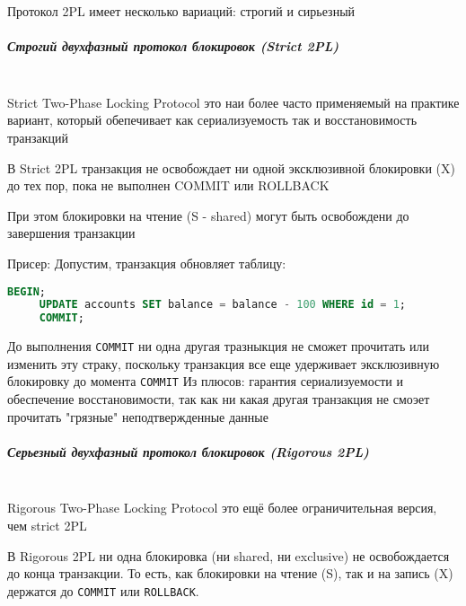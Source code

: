  Протокол 2PL имеет несколько вариаций: строгий и сирьезный
 
 \subparagraph{Строгий двухфазный протокол блокировок (Strict 2PL)} ~\\
 
 Strict Two-Phase Locking Protocol это наи более часто применяемый на практике вариант, который обепечивает как сериализуемость так и восстановимость транзакций
 
 \begin{grayquote}
     В Strict 2PL транзакция не освобождает ни одной эксклюзивной блокировки (X) до тех пор, пока не выполнен COMMIT или ROLLBACK \autocite{Silberschatz}
 \end{grayquote}
 
 При этом блокировки на чтение (S - shared) могут быть освобождени до завершения транзакции
 
 Присер:
 Допустим, транзакция обновляет таблицу:
 
 \begin{lstlisting}[language=SQL]
     BEGIN;
     UPDATE accounts SET balance = balance - 100 WHERE id = 1;
     COMMIT;    
 \end{lstlisting}
 До выполнения \texttt{COMMIT} ни одна другая тразныкция не сможет прочитать или изменить эту страку, поскольку транзакция все еще удерживает эксклюзивную блокировку до момента \texttt{COMMIT}
 Из плюсов: гарантия сериализуемости и обеспечение восстановимости, так как ни какая другая транзакция не смоэет прочитать "грязные" неподтвержденные данные
 
 \subparagraph{Серьезный двухфазный протокол блокировок (Rigorous 2PL)} ~\\
 
 Rigorous Two-Phase Locking Protocol это ещё более ограничительная версия, чем strict 2PL \autocite{Silberschatz}
 
 \begin{grayquote}
     В Rigorous 2PL ни одна блокировка (ни shared, ни exclusive) не освобождается до конца транзакции. 
     То есть, как блокировки на чтение (S), так и на запись (X) держатся до \texttt{COMMIT} или \texttt{ROLLBACK}. \autocite{Silberschatz}
 \end{grayquote}
 
